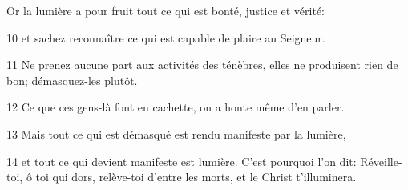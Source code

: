 
Or la lumière a pour fruit tout ce qui est bonté, justice et vérité:

10 et sachez reconnaître ce qui est capable de plaire au Seigneur.

11 Ne prenez aucune part aux activités des ténèbres, elles ne produisent rien de bon; démasquez-les plutôt.

12 Ce que ces gens-là font en cachette, on a honte même d’en parler.

13 Mais tout ce qui est démasqué est rendu manifeste par la lumière,

14 et tout ce qui devient manifeste est lumière. C’est pourquoi l’on dit: Réveille-toi, ô toi qui dors, relève-toi d’entre les morts, et le Christ t’illuminera.